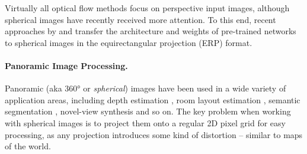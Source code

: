 Virtually all optical flow methods focus on perspective input images, although spherical images have recently received more attention.
%
To this end, recent approaches by \citet{ArtizZAD2020} and \citet{BhandZY2020}
transfer the architecture and weights of pre-trained networks \cite{DosovFIHHGSCB2015,HuiTC2018} to spherical images in the equirectangular projection (ERP) format.


\paragraph{Panoramic Image Processing.}

Panoramic (aka 360° or \emph{spherical}) images have been used in a wide variety of application areas, including
depth estimation \cite{ImHRJCK2016, JiangSZDH2021, LaiXLL2019, SunSC2021, WangHCLYSCS2018, WangSTCS2020, WangYSCT2020, ZioulKZD2018, ZioulKZAD2019},
room layout estimation \cite{WangYSCT2021, Tran2021, EderMG2019, FernaFPDCG2020, JinXZZTXYG2020, SunSC2021, ZengKG2020},
semantic segmentation \cite{LeeJYJY2019, SunSC2021, YangZRHS2021, ZhangLSC2019},
novel-view synthesis \cite{BerteYLR2020, HuangCCJ2017, MatzeCEKS2017, XuZXTG2021} and so on.
%
The key problem when working with spherical images is to project them onto a regular 2D pixel grid for easy processing, as any projection introduces some kind of distortion – similar to maps of the world.


